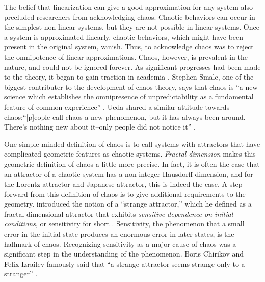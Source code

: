 \documentclass[10pt,twoside]{book}
\begin{document}
The belief that linearization can give a good approximation for any system also precluded researchers from acknowledging chaos.
Chaotic behaviors can occur in the simplest non-linear systems, but they are not possible in linear systems.
Once a system is approximated linearly, chaotic behaviors, which might have been present in the original system, vanish.
Thus, to acknowledge chaos was to reject the omnipotence of linear approximations.
Chaos, however, is prevalent in the nature, and could not be ignored forever.
As significant progresses had been made to the theory, it began to gain traction in academia \citep{gleick}.
Stephen Smale, one of the biggest contributer to the development of chaos theory, says that chaos is ``a new science which establishes the omnipresence of unpredictability as a fundamental feature of common experience'' \citep[p.16]{ueda-abraham}.
Ueda shared a similar attitude towards chaos:``[p]eople call chaos a new phenomenon, but it has always been around.
There's nothing new about it--only people did not notice it''
\citep[p.27]{ueda-abraham}.

One simple-minded definition of chaos is to call systems with attractors that have complicated geometric features as chaotic systems.
\textit{Fractal dimension} makes this geometric definition of chaos a little more precise.
In fact, it is often the case that an attractor of a chaotic system has a non-integer Hausdorff dimension, and for the Lorentz attractor and Japanese attractor, this is indeed the case.
A step forward from this definition of chaos is to give additional requirements to the geometry.
\citet{ruelle} introduced the notion of a ``strange attractor,'' which he defined as a fractal dimensional attractor that exhibits \textit{sensitive dependence on initial conditions}, or sensitivity for short \citep[p.11]{ott1994}.
Sensitivity, the phenomenon that a small error in the initial state produces an enormous error in later states, is the hallmark of chaos.
Recognizing sensitivity as a major cause of chaos was a significant step in the understanding of the phenomenon.
Boris Chirikov and Felix Izrailev famously said that ``a strange attractor seems strange only to a stranger'' \citep{lorentzbook}.
\end{document}
